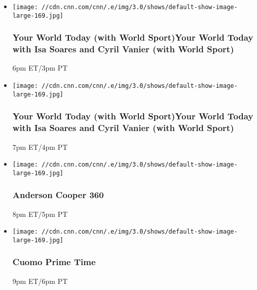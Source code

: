\begin{itemize}
\item
  \texttt{[image: //cdn.cnn.com/cnn/.e/img/3.0/shows/default-show-image-large-169.jpg]}

  \hypertarget{your-world-today-with-world-sportyour-world-today-with-isa-soares-and-cyril-vanier-with-world-sport-}{%
  \subsubsection{Your World Today (with World Sport)Your World Today
  with Isa Soares and Cyril Vanier (with World Sport)
  }\label{your-world-today-with-world-sportyour-world-today-with-isa-soares-and-cyril-vanier-with-world-sport-}}

  6pm ET/3pm PT
\end{itemize}

\begin{itemize}
\item
  \texttt{[image: //cdn.cnn.com/cnn/.e/img/3.0/shows/default-show-image-large-169.jpg]}

  \hypertarget{your-world-today-with-world-sportyour-world-today-with-isa-soares-and-cyril-vanier-with-world-sport--1}{%
  \subsubsection{Your World Today (with World Sport)Your World Today
  with Isa Soares and Cyril Vanier (with World Sport)
  }\label{your-world-today-with-world-sportyour-world-today-with-isa-soares-and-cyril-vanier-with-world-sport--1}}

  7pm ET/4pm PT
\end{itemize}

\begin{itemize}
\item
  \texttt{[image: //cdn.cnn.com/cnn/.e/img/3.0/shows/default-show-image-large-169.jpg]}

  \hypertarget{anderson-cooper-360}{%
  \subsubsection{Anderson Cooper 360}\label{anderson-cooper-360}}

  8pm ET/5pm PT
\end{itemize}

\begin{itemize}
\item
  \texttt{[image: //cdn.cnn.com/cnn/.e/img/3.0/shows/default-show-image-large-169.jpg]}

  \hypertarget{cuomo-prime-time}{%
  \subsubsection{Cuomo Prime Time}\label{cuomo-prime-time}}

  9pm ET/6pm PT
\end{itemize}

